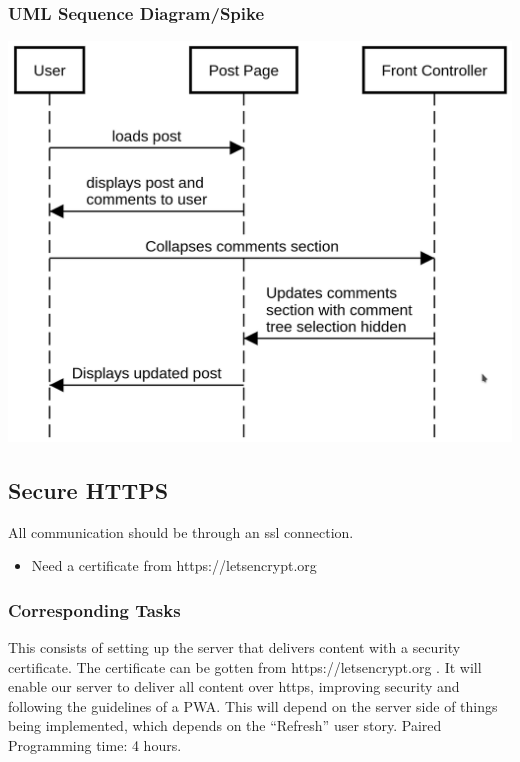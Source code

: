 \documentclass[12pt]{article}
\begin{document}
\subsubsection{UML Sequence Diagram/Spike}
\includegraphics[scale=0.5]{img/collapse_post_responses.png}\linebreak

\subsection{Secure HTTPS}
All communication should be through an ssl connection.
\begin{itemize}
  \item Need a certificate from https://letsencrypt.org
\end{itemize}
\subsubsection{Corresponding Tasks}
	This consists of setting up the server that delivers content with a security certificate.  The certificate can be gotten from https://letsencrypt.org .  It will enable our server to deliver all content over https, improving security and following the guidelines of a PWA.  This will depend on the server side of things being implemented, which depends on the “Refresh” user story.  Paired Programming time: 4 hours.
\end{document}
